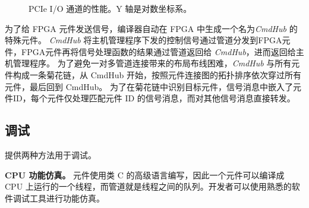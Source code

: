 \begin{figure}[htbp]
	\centering

	\caption{PCIe I/O 通道的性能。Y 轴是对数坐标系。}

	\label{clicknp:fig:pcie}
\end{figure}

为了给 FPGA 元件发送信号，\name 编译器自动在 FPGA 中生成一个名为\textit {CmdHub} 的特殊元件。
\textit {CmdHub} 将主机管理程序下发的控制信号通过管道分发到FPGA元件，FPGA元件再将信号处理函数的结果通过管道返回给 \textit {CmdHub}，进而返回给主机管理程序。
为了避免一对多管道连接带来的布局布线困难，\textit {CmdHub} 与所有元件构成一条菊花链，从 CmdHub 开始，按照元件连接图的拓扑排序依次穿过所有元件，最后回到 CmdHub。
为了在菊花链中识别目标元件，信号消息中嵌入了元件ID，每个元件仅处理匹配元件 ID 的信号消息，而对其他信号消息直接转发。
 


\subsection{调试}
\label{clicknp:subsec:debug}

\name 提供两种方法用于调试。

\textbf{CPU 功能仿真。}
\name 元件使用类 C 的高级语言编写，因此一个元件可以编译成 CPU 上运行的一个线程，而管道就是线程之间的队列。开发者可以使用熟悉的软件调试工具进行功能仿真。



